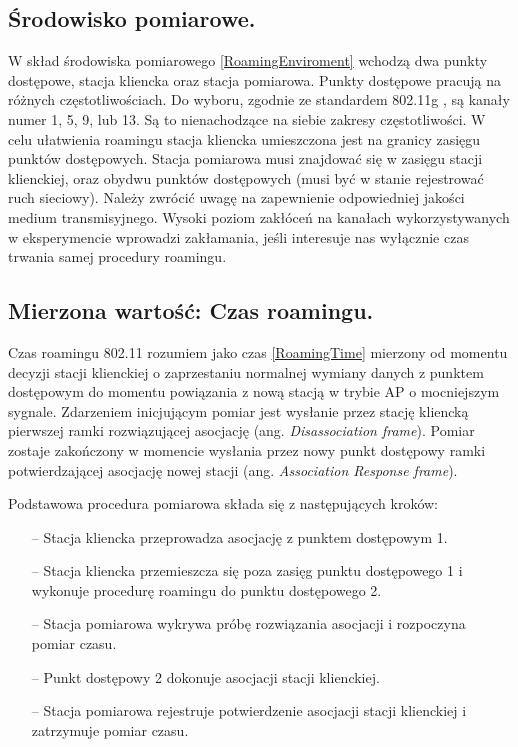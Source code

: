 \subsection{Środowisko pomiarowe.}
\label{sec:MeasurementEnviroment}

W skład środowiska pomiarowego \ref{RoamingEnviroment} wchodzą dwa punkty dostępowe, stacja kliencka oraz stacja pomiarowa. Punkty dostępowe pracują na różnych częstotliwościach. Do wyboru, zgodnie ze standardem 802.11g \cite{std:IEEE80211}, są kanały numer 1, 5, 9, lub 13. Są to nienachodzące na siebie zakresy częstotliwości. W celu ułatwienia roamingu stacja kliencka umieszczona jest na granicy zasięgu punktów dostępowych. Stacja pomiarowa musi znajdować się w zasięgu stacji klienckiej, oraz obydwu punktów dostępowych (musi być w stanie rejestrować ruch sieciowy). 
Należy zwrócić uwagę na zapewnienie odpowiedniej jakości medium transmisyjnego. Wysoki poziom zakłóceń na kanałach wykorzystywanych w eksperymencie wprowadzi zakłamania, jeśli interesuje nas wyłącznie czas trwania samej procedury roamingu. 

\subsection{Mierzona wartość: Czas roamingu.}
Czas roamingu 802.11 rozumiem jako czas \ref{RoamingTime} mierzony od momentu decyzji stacji klienckiej o zaprzestaniu normalnej wymiany danych z punktem dostępowym do momentu powiązania z nową stacją w trybie AP o mocniejszym sygnale. Zdarzeniem inicjującym pomiar jest wysłanie przez stację kliencką pierwszej ramki rozwiązującej asocjację (ang. \emph{Disassociation frame}). Pomiar zostaje zakończony w momencie wysłania przez nowy punkt dostępowy ramki potwierdzającej asocjację nowej stacji (ang. \emph{Association Response frame}).

Podstawowa procedura pomiarowa składa się z następujących kroków:
\begin{itemize}
\item[--] Stacja kliencka przeprowadza asocjację z punktem dostępowym 1.
\item[--] Stacja kliencka przemieszcza się poza zasięg punktu dostępowego 1 i wykonuje procedurę roamingu do punktu dostępowego 2.
\item[--] Stacja pomiarowa wykrywa próbę rozwiązania asocjacji i rozpoczyna pomiar czasu.
\item[--] Punkt dostępowy 2 dokonuje asocjacji stacji klienckiej.
\item[--] Stacja pomiarowa rejestruje potwierdzenie asocjacji stacji klienckiej i zatrzymuje pomiar czasu.
\end{itemize}

